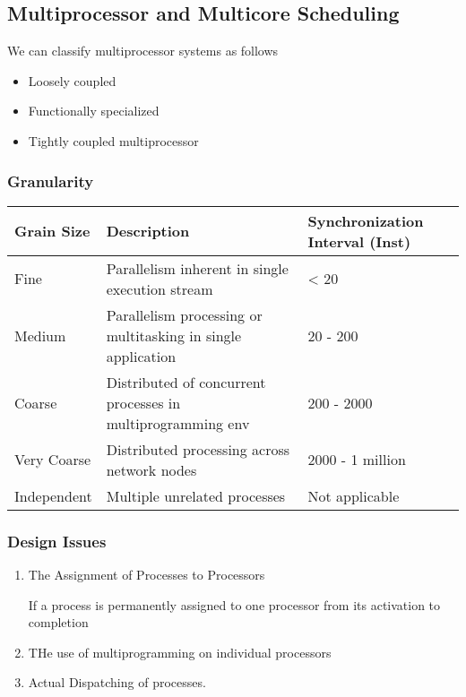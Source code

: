 \documentclass[11pt]{article}
\begin{document}
\subsection{Multiprocessor and Multicore Scheduling}
\label{sec:orgheadline113}

We can classify multiprocessor systems as follows

\begin{itemize}
\item Loosely coupled
\item Functionally specialized
\item Tightly coupled multiprocessor
\end{itemize}

\subsubsection{Granularity}
\label{sec:orgheadline98}

\begin{center}
\begin{tabular}{lll}
Grain Size & Description & Synchronization Interval (Inst)\\
\hline
Fine & Parallelism inherent in single execution stream & < 20\\
Medium & Parallelism processing or multitasking in single application & 20 - 200\\
Coarse & Distributed of concurrent processes in multiprogramming env & 200 - 2000\\
Very Coarse & Distributed processing across network nodes & 2000 - 1 million\\
Independent & Multiple unrelated processes & Not applicable\\
\end{tabular}
\end{center}

\subsubsection{Design Issues}
\label{sec:orgheadline102}

\begin{enumerate}
\item The Assignment of Processes to Processors
\label{sec:orgheadline99}

If a process is permanently assigned to one processor from
its activation to completion

\item THe use of multiprogramming on individual processors
\label{sec:orgheadline100}

\item Actual Dispatching of processes.
\label{sec:orgheadline101}
\end{enumerate}
\end{document}
